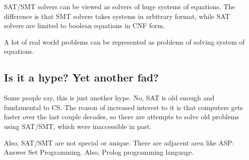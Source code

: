 \ac{SAT}/\ac{SMT} solvers can be viewed as solvers of huge systems of equations.
The difference is that \ac{SMT} solvers takes systems in arbitrary format,
while \ac{SAT} solvers are limited to boolean equations in \ac{CNF} form.

A lot of real world problems can be represented as problems of solving system of equations.

\subsection{Is it a hype? Yet another fad?}

Some people say, this is just another hype.
No, \ac{SAT} is old enough and fundamental to \ac{CS}.
The reason of increased interest to it is that computers gets faster over the last couple decades,
so there are attempts to solve old problems using \ac{SAT}/\ac{SMT}, which were inaccessible in past.

Also, SAT/SMT are not special or unique.
There are adjacent area like ASP: Answer Set Programming.
Also, Prolog programming language.


